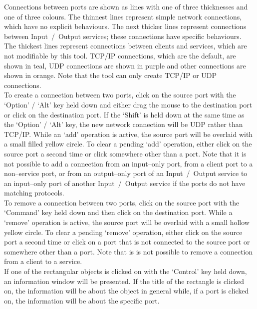Connections between ports are shown as lines with one of three thicknesses and one of
three colours.
The thinnest lines represent simple \yarp{} network connections, which have no explicit
behaviours.
The next thicker lines represent connections between Input~/~Output services; these
connections have specific behaviours.
The thickest lines represent connections between clients and services, which are not
modifiable by this tool.
TCP/IP connections, which are the default, are shown in teal, UDP connections are shown in
purple and other connections are shown in orange.
Note that the tool can only create TCP/IP or UDP connections.\\

To create a connection between two ports, click on the source port with the `Option' /
`Alt' key held down and either drag the mouse to the destination port or click on the
destination port.
If the `Shift' is held down at the same time as the `Option' / `Alt' key, the new
network connection will be UDP rather than TCP/IP.
While an `add' operation is active, the source port will be overlaid with a small filled
yellow circle.
To clear a pending `add' operation, either click on the source port a second time or click
somewhere other than a port.
Note that it is not possible to add a connection from an input--only port, from a client
port to a non--service port, or from an output--only port of an Input~/~Output service to
an input--only port of another Input~/~Output service if the ports do not have matching
protocols.\\

To remove a connection between two ports, click on the source port with the `Command' key
held down and then click on the destination port.
While a `remove' operation is active, the source port will be overlaid with a small
hollow yellow circle.
To clear a pending `remove' operation, either click on the source port a second time or
click on a port that is not connected to the source port or somewhere other than a port.
Note that is is not possible to remove a connection from a client to a service.\\

If one of the rectangular objects is clicked on with the `Control' key held down, an
information window will be presented.
If the title of the rectangle is clicked on, the information will be about the
object in general while, if a port is clicked on, the information will be about the
specific port.\\

